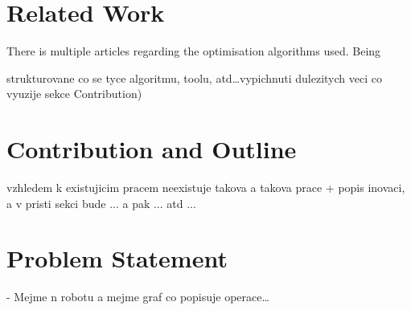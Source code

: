 \section{Related Work}

There is multiple articles regarding the optimisation algorithms used. Being 

strukturovane co se tyce algoritmu, toolu, atd\ldots vypichnuti dulezitych veci co vyuzije sekce Contribution)

\section{Contribution and Outline}

vzhledem k existujicim pracem neexistuje takova a takova prace + popis inovaci, a v pristi sekci bude ... a pak ... atd ...

\section{Problem Statement}
- Mejme n robotu a mejme graf co popisuje operace\ldots 
